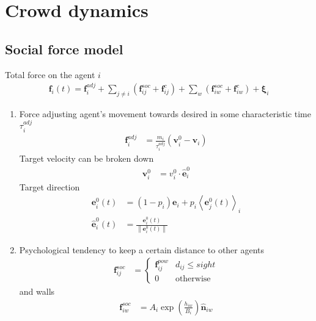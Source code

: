 \section{Crowd dynamics}
\subsection{Social force model}
Total force on the agent $ i $
\begin{align}
\mathbf{f}_{i}(t) = \mathbf{f}_{i}^{adj} + \sum_{j\neq i}^{} \left(\mathbf{f}_{ij}^{soc} + \mathbf{f}_{ij}^{c}\right) + \sum_{w}^{} \left(\mathbf{f}_{iw}^{soc} + \mathbf{f}_{iw}^{c}\right) + \boldsymbol{\xi}_{i}
\end{align}

\begin{enumerate}[label=\roman{enumi})]
\item 
Force adjusting agent's movement towards desired in some characteristic time $ \tau_{i}^{adj} $
\begin{align}
\mathbf{f}_{i}^{adj} &= \frac{m_{i}}{\tau_{i}^{adj}} (\mathbf{v}_{i}^{0} - \mathbf{v}_{i}) 
\end{align}
Target velocity can be broken down
\begin{align}
\mathbf{v}_{i}^{0} &= v_{i}^{0} \cdot \hat{\mathbf{e}}_{i}^{0}
\end{align}
Target direction
\begin{align}
\mathbf{e}_{i}^{0}(t) &= (1 - p_{i})\mathbf{e}_{i} + p_{i} \left\langle \mathbf{e}_{j}^{0}(t) \right\rangle_{i} \\
\hat{\mathbf{e}}_{i}^{0}(t) &= \frac{\mathbf{e}_{i}^{0}(t)}{\left\| \mathbf{e}_{i}^{0}(t) \right\|}
\end{align}

\item 
Psychological tendency to keep a certain distance to other agents
\begin{align}
\mathbf{f}_{ij}^{soc} &=
\begin{cases}
\mathbf{f}_{ij}^{pow} &  d_{ij} \leq sight \\
0 & \text{otherwise}
\end{cases}
\end{align}
and walls
\begin{align}
\mathbf{f}_{iw}^{soc} &= A_{i} \exp\left(\frac{h_{iw}}{B_{i}}\right) \hat{\mathbf{n}}_{iw}
\end{align} 



\end{enumerate}
